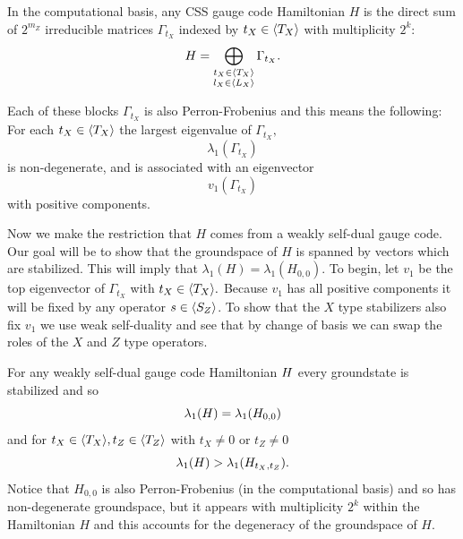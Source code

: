 \documentclass[12pt]{article}
\renewenvironment{framed}[1][\hsize]{%
\def\FrameCommand{{\color{black}\vrule width 3pt}\hspace{0pt}\fboxsep=\FrameSep\colorbox{lightgray}}%
\MakeFramed{\hsize0.8\linewidth\advance\hsize-\width\FrameRestore}}
{\endMakeFramed}
\begin{document}
\begin{framed}
In the computational basis, any CSS gauge code
Hamiltonian $H$ is the direct sum of $2^{m_Z}$
irreducible matrices $\Gamma_{t_X}$
indexed by $t_X\in\langle T_X \rangle$
with multiplicity $2^k$:
$$
    H = \bigoplus_{
    \substack{t_X\in\langle T_X \rangle\\l_X\in\langle L_X \rangle}}
        \Gamma_{t_X}.
$$
\end{framed}

Each of these blocks $\Gamma_{t_X}$ is also Perron-Frobenius
and this means the following:
\begin{framed}
For each $t_X\in\langle T_X \rangle$
the largest eigenvalue 
of $\Gamma_{t_X},$
$$\lambda_1(\Gamma_{t_X})
$$
is non-degenerate,
and is associated with an eigenvector 
$$v_1(\Gamma_{t_X})
$$
with positive components.
\end{framed}

Now we make the restriction that $H$
comes from a weakly self-dual gauge code.
Our goal will be to show that the
groundspace of $H$ is spanned
by vectors which are stabilized.
This will imply that $\lambda_1(H)=\lambda_1(H_{0,0}).$
To begin, let $v_1$ be the top
eigenvector of $\Gamma_{t_X}$ with $t_X\in\langle T_X \rangle.$
Because $v_1$ has all positive components
it will be fixed by  any operator
$s\in\langle S_Z \rangle$.
To show that the $X$ type stabilizers
also fix $v_1$ 
we use weak self-duality
and see that by change of basis
we can swap the roles of the $X$ and $Z$ type operators.
\begin{framed}

For any weakly self-dual gauge code Hamiltonian $H$
every groundstate is stabilized 
and so $$\lambda_1(H) = \lambda_1(H_{0,0})$$
and for $t_X\in\langle T_X \rangle, t_Z\in\langle T_Z \rangle$
with $t_X\ne 0$ or $t_Z\ne 0$
$$
\lambda_1(H) > \lambda_1(H_{t_X,t_Z}).
$$
\end{framed}
Notice that 
$H_{0,0}$ is also Perron-Frobenius (in the computational basis)
and so has non-degenerate
groundspace, but it appears with multiplicity $2^k$ within
the Hamiltonian $H$ and this accounts for the degeneracy of the
groundspace of $H$.

\end{document}
